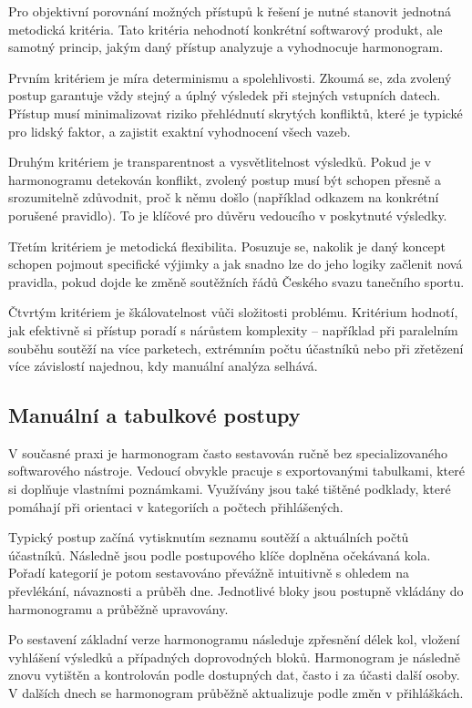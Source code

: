 \documentclass[czech, kiv, ba, he, iso690alph, pdf]{fasthesis}
\begin{document}
				Pro objektivní porovnání možných přístupů k řešení je nutné stanovit jednotná metodická kritéria. Tato kritéria nehodnotí konkrétní softwarový produkt, ale samotný princip, jakým daný přístup analyzuje a vyhodnocuje harmonogram.
			
				Prvním kritériem je míra determinismu a spolehlivosti. Zkoumá se, zda zvolený postup garantuje vždy stejný a úplný výsledek při stejných vstupních datech. Přístup musí minimalizovat riziko přehlédnutí skrytých konfliktů, které je typické pro lidský faktor, a zajistit exaktní vyhodnocení všech vazeb.
			
				Druhým kritériem je transparentnost a vysvětlitelnost výsledků. Pokud je v harmonogramu detekován konflikt, zvolený postup musí být schopen přesně a srozumitelně zdůvodnit, proč k němu došlo (například odkazem na konkrétní porušené pravidlo). To je klíčové pro důvěru vedoucího v poskytnuté výsledky.
			
				Třetím kritériem je metodická flexibilita. Posuzuje se, nakolik je daný koncept schopen pojmout specifické výjimky a jak snadno lze do jeho logiky začlenit nová pravidla, pokud dojde ke změně soutěžních řádů Českého svazu tanečního sportu.
			
				Čtvrtým kritériem je škálovatelnost vůči složitosti problému. Kritérium hodnotí, jak efektivně si přístup poradí s nárůstem komplexity – například při paralelním souběhu soutěží na více parketech, extrémním počtu účastníků nebo při zřetězení více závislostí najednou, kdy manuální analýza selhává.

			\subsection{Manuální a tabulkové postupy}

				V současné praxi je harmonogram často sestavován ručně bez specializovaného softwarového nástroje. Vedoucí obvykle pracuje s exportovanými tabulkami, které si doplňuje vlastními poznámkami. Využívány jsou také tištěné podklady, které pomáhají při orientaci v kategoriích a počtech přihlášených.
	
				Typický postup začíná vytisknutím seznamu soutěží a aktuálních počtů účastníků. Následně jsou podle postupového klíče doplněna očekávaná kola. Pořadí kategorií je potom sestavováno převážně intuitivně s ohledem na převlékání, návaznosti a průběh dne. Jednotlivé bloky jsou postupně vkládány do harmonogramu a průběžně upravovány.
	
				Po sestavení základní verze harmonogramu následuje zpřesnění délek kol, vložení vyhlášení výsledků a případných doprovodných bloků. Harmonogram je následně znovu vytištěn a kontrolován podle dostupných dat, často i za účasti další osoby. V dalších dnech se harmonogram průběžně aktualizuje podle změn v přihláškách.
	
\end{document}
